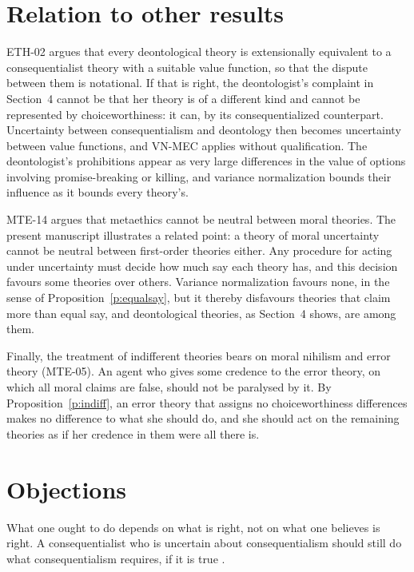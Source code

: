 \documentclass{situationist-preprint}
\begin{document}
\section{Relation to other results}

ETH-02 argues that every deontological theory is extensionally equivalent to a consequentialist theory with a suitable value function, so that the dispute between them is notational. If that is right, the deontologist's complaint in Section~4 cannot be that her theory is of a different kind and cannot be represented by choiceworthiness: it can, by its consequentialized counterpart. Uncertainty between consequentialism and deontology then becomes uncertainty between value functions, and VN-MEC applies without qualification. The deontologist's prohibitions appear as very large differences in the value of options involving promise-breaking or killing, and variance normalization bounds their influence as it bounds every theory's.

MTE-14 argues that metaethics cannot be neutral between moral theories. The present manuscript illustrates a related point: a theory of moral uncertainty cannot be neutral between first-order theories either. Any procedure for acting under uncertainty must decide how much say each theory has, and this decision favours some theories over others. Variance normalization favours none, in the sense of Proposition~\ref{p:equalsay}, but it thereby disfavours theories that claim more than equal say, and deontological theories, as Section~4 shows, are among them.

Finally, the treatment of indifferent theories bears on moral nihilism and error theory (MTE-05). An agent who gives some credence to the error theory, on which all moral claims are false, should not be paralysed by it. By Proposition~\ref{p:indiff}, an error theory that assigns no choiceworthiness differences makes no difference to what she should do, and she should act on the remaining theories as if her credence in them were all there is.

\section{Objections}

\begin{objection}[Irrelevance]
What one ought to do depends on what is right, not on what one believes is right. A consequentialist who is uncertain about consequentialism should still do what consequentialism requires, if it is true \citep{Weatherson2014,Harman2015}.
\end{objection}
\end{document}
